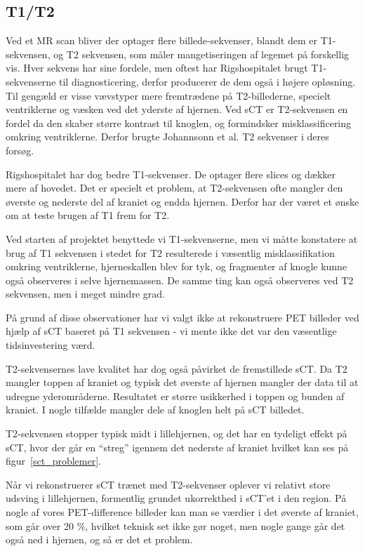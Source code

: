 \subsection{T1/T2}

Ved et MR scan bliver der optager flere billede-sekvenser, blandt dem er T1-sekvensen, og T2 sekvensen, som måler mangetiseringen af legemet på forskellig vis. Hver sekvens har sine fordele, men oftest har Rigshospitalet brugt T1-sekvenserne til diagnosticering, derfor producerer de dem også i højere opløsning. Til gengæld er visse vævstyper mere fremtrædene på T2-billederne, specielt ventriklerne og væsken ved det yderste af hjernen. Ved sCT er T2-sekvensen en fordel da den skaber større kontrast til knoglen, og formindsker misklassificering omkring ventriklerne. Derfor brugte Johannsonn et al. T2 sekvenser i deres forsøg.

Rigshospitalet har dog bedre T1-sekvenser. De optager flere slices og dækker mere af hovedet. Det er specielt et problem, at T2-sekvensen ofte mangler den øverste og nederste del af kraniet og endda hjernen. Derfor har der været et ønske om at teste brugen af T1 frem for T2.

Ved starten af projektet benyttede vi T1-sekvenserne, men vi måtte konstatere at brug af T1 sekvensen i stedet for T2 resulterede i væsentlig misklassifikation omkring ventriklerne, hjerneskallen blev for tyk, og fragmenter af knogle kunne også observeres i selve hjernemassen. De samme ting kan også observeres ved T2 sekvensen, men i meget mindre grad.

På grund af disse observationer har vi valgt ikke at rekonstruere PET billeder ved hjælp af sCT baseret på T1 sekvensen - vi mente ikke det var den væsentlige tidsinvestering værd.

T2-sekvensernes lave kvalitet har dog også påvirket de fremstillede sCT. Da T2 mangler toppen af kraniet og typisk det øverste af hjernen mangler der data til at udregne yderområderne. Resultatet er større usikkerhed i toppen og bunden af kraniet. I nogle tilfælde mangler dele af knoglen helt på sCT billedet. 

T2-sekvensen stopper typisk midt i lillehjernen, og det har en tydeligt effekt på sCT, hvor der går en “streg” igennem det nederste af kraniet hvilket kan ses på figur~\ref{sct_problemer}. 

Når vi rekonstruerer sCT trænet med T2-sekvenser oplever vi relativt store udsving i lillehjernen, formentlig grundet ukorrekthed i sCT’et i den region. På nogle af vores PET-difference billeder kan man se værdier i det øverste af kraniet, som går over 20 \%, hvilket teknisk set ikke gør noget, men nogle gange går det også ned i hjernen, og så er det et problem.

